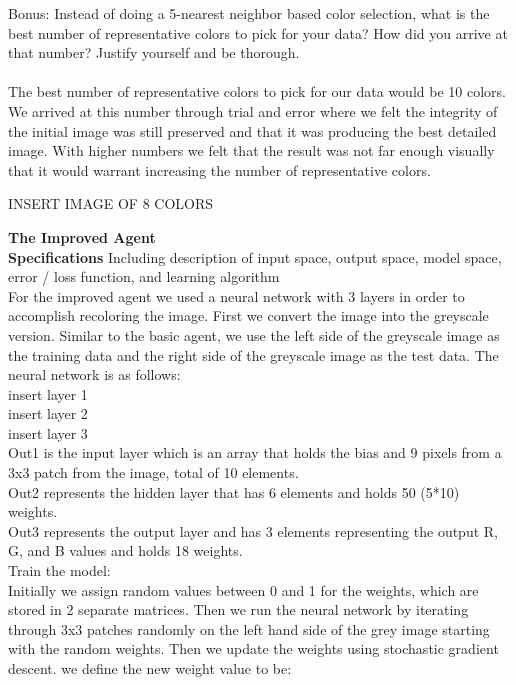\documentclass{article}
\theoremstyle{definition}
\begin{document}
 Bonus: Instead of doing a 5-nearest neighbor based color selection, what is the best number of representative colors to pick for your data? How did you arrive at that number? Justify yourself and be thorough. \\\\
 The best number of representative colors to pick for our data would be 10 colors. We arrived at this number through trial and error where we felt the integrity of the initial image was still preserved and that it was producing the best detailed image. With higher numbers we felt that the result was not far enough visually that it would warrant increasing the number of representative colors. 
 
 INSERT IMAGE OF 8 COLORS

\textbf{\Large The Improved Agent} \\

	\textbf{Specifications}
	    Including description of input space, output space, model space, error / loss function, and learning algorithm \\
        For the improved agent we used a neural network with 3 layers in order to accomplish recoloring the image. First we convert the image into the greyscale version. Similar to the basic agent, we use the left side of the greyscale image as the training data and the right side of the greyscale image as the test data.
        The neural network is as follows: \\
        
        insert layer 1 \\
        insert layer 2 \\
        insert layer 3 \\
        
        Out1 is the input layer which is an array that holds the bias and 9 pixels from a 3x3 patch from the image, total of 10 elements. \\
        Out2 represents the hidden layer that has 6 elements and holds 50 (5*10) weights. \\
        Out3 represents the output layer and has 3 elements representing the output R, G, and B values and holds 18 weights. \\
        
        Train the model: \\
        Initially we assign random values between 0 and 1 for the weights, which are stored in 2 separate matrices. Then we run the neural network by iterating through 3x3 patches randomly on the left hand side of the grey image starting with the random weights. Then we update the weights using stochastic gradient descent. we define the new weight value to be: \\
        
\end{document}
